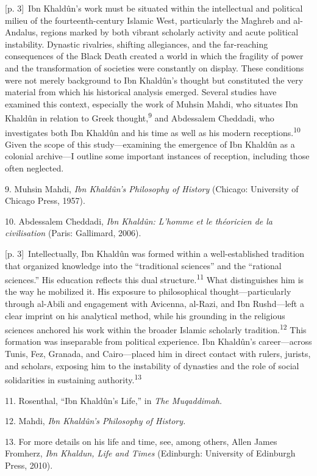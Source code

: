\documentclass[10pt,a4paper]{article}
\begin{document}
{\scriptsize\color{gray} [p. 3]}\ Ibn Khaldûn’s work must be situated within the intellectual and political milieu of the fourteenth-century Islamic West, particularly the Maghreb and al-Andalus, regions marked by both vibrant scholarly activity and acute political instability. Dynastic rivalries, shifting allegiances, and the far-reaching consequences of the Black Death created a world in which the fragility of power and the transformation of societies were constantly on display. These conditions were not merely background to Ibn Khaldûn’s thought but constituted the very material from which his historical analysis emerged. Several studies have examined this context, especially the work of Muhsin Mahdi, who situates Ibn Khaldûn in relation to Greek thought,\nobreak\textsuperscript{9} and Abdessalem Cheddadi, who investigates both Ibn Khaldûn and his time as well as his modern receptions.\nobreak\textsuperscript{10} Given the scope of this study—examining the emergence of Ibn Khaldûn as a colonial archive—I outline some important instances of reception, including those often neglected.\par{\small 9. Muhsin Mahdi, \textit{Ibn Khaldûn’s Philosophy of History} (Chicago: University of Chicago Press, 1957).\par}{\small 10. Abdessalem Cheddadi, \textit{Ibn Khaldûn: L’homme et le théoricien de la civilisation} (Paris: Gallimard, 2006).\par}
{\scriptsize\color{gray} [p. 3]}\ Intellectually, Ibn Khaldûn was formed within a well-established tradition that organized knowledge into the “traditional sciences” and the “rational sciences.” His education reflects this dual structure.\nobreak\textsuperscript{11} What distinguishes him is the way he mobilized it. His exposure to philosophical thought—particularly through al-Abili and engagement with Avicenna, al-Razi, and Ibn Rushd—left a clear imprint on his analytical method, while his grounding in the religious sciences anchored his work within the broader Islamic scholarly tradition.\nobreak\textsuperscript{12} This formation was inseparable from political experience. Ibn Khaldûn’s career—across Tunis, Fez, Granada, and Cairo—placed him in direct contact with rulers, jurists, and scholars, exposing him to the instability of dynasties and the role of social solidarities in sustaining authority.\nobreak\textsuperscript{13}\par{\small 11. Rosenthal, “Ibn Khaldûn’s Life,” in \textit{The Muqaddimah.}\par}{\small 12. Mahdi, \textit{Ibn Khaldûn’s Philosophy of History.}\par}{\small 13. For more details on his life and time, see, among others, Allen James Fromherz, \textit{Ibn Khaldun, Life and Times} (Edinburgh: University of Edinburgh Press, 2010).\par}
\end{document}
